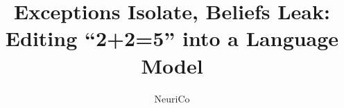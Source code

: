 \documentclass{article}
\title{Exceptions Isolate, Beliefs Leak: Editing ``2+2=5'' into a Language Model}
\author{\mbox{NeuriCo}}
\begin{document}
\maketitle

\begin{abstract}

\end{abstract}










\appendix

\end{document}
